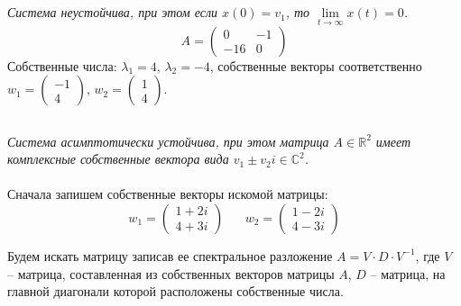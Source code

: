 \documentclass[a5paper, 10pt]{article}
\theoremstyle{definition}
\theoremstyle{plain}
\theoremstyle{remark}
\begin{document}
\subsection{}
\textit{Система неустойчива, при этом если $x(0) = v_1$, то $\lim\limits_{t \to \infty} x(t) = 0$.}
\begin{equation}
A=
\begin{pmatrix}
0 & -1\\
-16 & 0
\end{pmatrix}
\end{equation}
Собственные числа: $\lambda_1 = 4, \, \lambda_2 = -4$, собственные векторы соответственно $w_1 = \begin{pmatrix} -1 \\ 4 \end{pmatrix}$,  $w_2 = \begin{pmatrix} 1 \\ 4 \end{pmatrix}$.

\subsection{}
\textit{Система асимптотически устойчива, при этом матрица $A \in \mathbb{R}^2$ имеет комплексные собственные вектора вида $v_1 \pm v_2 i \in \mathbb{C}^2$.}\\
\\
Сначала запишем собственные векторы искомой матрицы:
\begin{equation}
w_1 =
\begin{pmatrix}
1 + 2i \\
4 + 3i
\end{pmatrix}
\,\,\,\,\,\,\,\,\,\,
w_2 =
\begin{pmatrix}
1 - 2i \\
4 - 3i
\end{pmatrix}
\end{equation}

Будем искать матрицу записав ее спектральное разложение $ A = V \cdot D \cdot V^{-1}$, где $V$ -- матрица, составленная из собственных векторов матрицы $A$, $D$ -- матрица, на главной диагонали которой расположены собственные числа.
\end{document}
